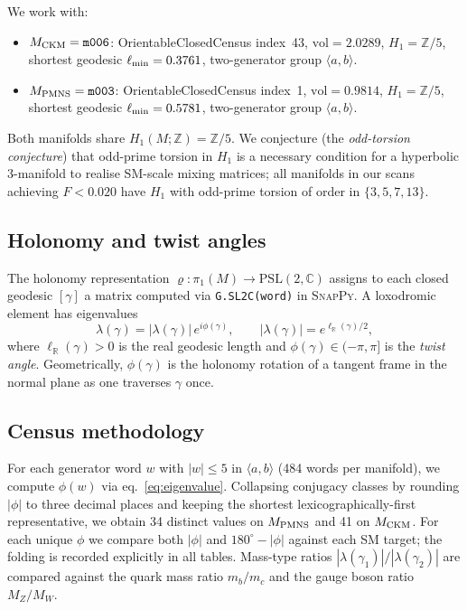 ﻿\documentclass[aps,prd,twocolumn,longbibliography]{revtex4-2}
\newcommand{\PSL}{\mathrm{PSL}(2,\mathbb{C})}
\newcommand{\pioneM}{\pi_1(M)}
\newcommand{\mfld}[1]{\texttt{#1}}
\newcommand{\degr}{^{\circ}}
\begin{document}
We work with:
\begin{itemize}
\item $M_{\rm CKM} = \mfld{m006}$: OrientableClosedCensus index~43,
      $\mathrm{vol}=2.0289$, $H_1=\mathbb{Z}/5$,
      shortest geodesic $\ell_{\rm min}=0.3761$,
      two-generator group $\langle a,b\rangle$.
\item $M_{\rm PMNS} = \mfld{m003}$: OrientableClosedCensus index~1,
      $\mathrm{vol}=0.9814$, $H_1=\mathbb{Z}/5$,
      shortest geodesic $\ell_{\rm min}=0.5781$,
      two-generator group $\langle a,b\rangle$.
\end{itemize}
Both manifolds share $H_1(M;\mathbb{Z})=\mathbb{Z}/5$.
We conjecture (the \emph{odd-torsion conjecture}) that odd-prime torsion
in $H_1$ is a necessary condition for a hyperbolic 3-manifold to realise
SM-scale mixing matrices; all manifolds in our scans achieving $F<0.020$
have $H_1$ with odd-prime torsion of order in $\{3,5,7,13\}$.

\subsection{Holonomy and twist angles}

The holonomy representation $\varrho:\pioneM\to\PSL$ assigns to each closed
geodesic $[\gamma]$ a matrix computed via \texttt{G.SL2C(word)} in \textsc{SnapPy}.
A loxodromic element has eigenvalues
\begin{equation}
  \lambda(\gamma) = |\lambda(\gamma)|\,e^{i\phi(\gamma)},\qquad
  |\lambda(\gamma)| = e^{\ell_{\mathbb{R}}(\gamma)/2},
  \label{eq:eigenvalue}
\end{equation}
where $\ell_{\mathbb{R}}(\gamma)>0$ is the real geodesic length and
$\phi(\gamma)\in(-\pi,\pi]$ is the \emph{twist angle}.
Geometrically, $\phi(\gamma)$ is the holonomy rotation of a tangent frame
in the normal plane as one traverses $\gamma$ once.

\subsection{Census methodology}

For each generator word $w$ with $|w|\leq 5$ in $\langle a,b\rangle$ (484 words per manifold),
we compute $\phi(w)$ via eq.~\eqref{eq:eigenvalue}.
Collapsing conjugacy classes by rounding $|\phi|$ to three decimal places and
keeping the shortest lexicographically-first representative, we obtain
34 distinct values on $M_{\rm PMNS}$ and 41 on $M_{\rm CKM}$.
For each unique $\phi$ we compare both $|\phi|$ and $180\degr-|\phi|$
against each SM target; the folding is recorded explicitly in all tables.
Mass-type ratios $|\lambda(\gamma_1)|/|\lambda(\gamma_2)|$ are compared against
the quark mass ratio $m_b/m_c$ and the gauge boson ratio $M_Z/M_W$.
\end{document}
